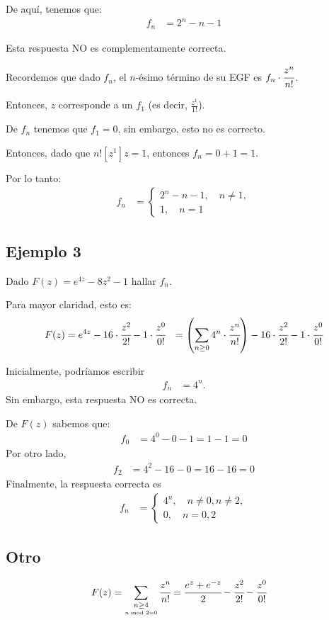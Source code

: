 De aquí, tenemos que:
\begin{align*}
f_n&=2^n-n-1
\end{align*}

{\color{red} Esta respuesta NO es complementamente correcta.}

Recordemos que dado $f_n$, el $n$-ésimo término de su EGF es $f_n\cdot \cfrac{z^n}{n!}$.

Entonces, $z$ corresponde a un $f_1$ (es decir, $\frac{z^1}{1!}$).

De $f_n$ tenemos que $f_1=0$, sin embargo, esto no es correcto.

Entonces, dado que $n![z^1]z=1$, entonces
$f_n=0+1=1$.

Por lo tanto:
\begin{align*}
f_n&=\begin{cases}
2^n-n-1,\quad n\not=1,\\
1,\quad n=1
\end{cases}
\end{align*}

\subsection*{Ejemplo 3}
Dado $F(z)=e^{4z}-8z^2-1$
hallar $f_n$.

Para mayor claridad, esto es:
\begin{align*}
F(z)&=e^{4z}-16\cdot \cfrac{z^2}{2!}-1\cdot\cfrac{z^{0}}{0!}
&=\left(\sum_{n\geq0}{4^n\cdot\cfrac{z^{n}}{n!}}\right)-16\cdot \cfrac{z^2}{2!}-1\cdot\cfrac{z^{0}}{0!}
\end{align*}

Inicialmente, podríamos escribir
\begin{align*}
f_n&=4^n.
\end{align*}
Sin embargo, esta respuesta NO es correcta.

De $F(z)$ sabemos que:
\begin{align*}
f_0&=4^0-0-1=1-1=0
\end{align*}
Por otro lado,
\begin{align*}
f_2&=4^2-16-0=16-16=0
\end{align*}
Finalmente, la respuesta correcta es
\begin{align*}
f_n&=\begin{cases}
4^n,\quad n\not=0, n\not=2,\\
0,\quad n=0,2
\end{cases}
\end{align*}

\subsection*{Otro}
\begin{align*}
F(z)&=\sum_{\underset{n\bmod2=0}{n\geq4}}{\cfrac{z^{n}}{n!}}=\cfrac{e^z+e^{-z}}{2}-\cfrac{z^{2}}{2!}-\cfrac{z^{0}}{0!}
\end{align*}